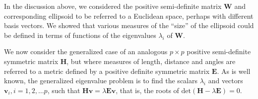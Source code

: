 \documentclass[11pt]{article}%
\renewcommand*{\vec}[1]{\ensuremath{\bm{#1}}}
\newcommand*{\mat}[1]{\ensuremath{\bm{#1}}}
\renewcommand*{\det}[1]{\ensuremath{\mathrm{det} (#1)}}
\begin{document}
In the discussion above, we considered the positive semi-definite matrix \mat{W} and
corresponding ellipsoid to be 
referred to a Euclidean space, perhaps with different basis vectors. 
We showed that various measures of the ``size'' of the ellipsoid could be defined
in terms of functions of the eigenvalues $\lambda_i$ of \mat{W}.

We now consider the generalized 
case of an analogous $p \times p$ positive semi-definite symmetric matrix \mat{H}, but where measures of
length, distance and angles are referred to a metric defined by a positive definite symmetric
matrix \mat{E}. As is well known, the generalized eigenvalue problem is to find the scalars
$\lambda_i$ and vectors $\vec{v}_i, i=1, 2, \dots p$,
such that $\mat{H} \vec{v} = \lambda \mat{E} \vec{v}$, that is, the roots of
$\det{\mat{H} - \lambda \mat{E}}=0$.
\end{document}
